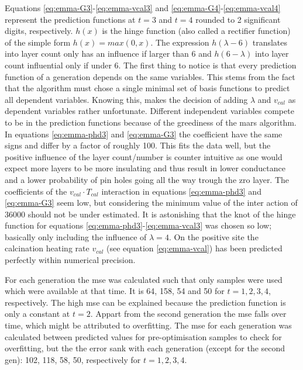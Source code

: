 Equations \ref{eq:emma-G3}-\ref{eq:emma-vcal3} and \ref{eq:emma-G4}-\ref{eq:emma-vcal4} represent the prediction functions at $t=3$ and $t=4$ rounded to 2 significant digits, respectively.
$h(x)$ is the hinge function (also called a rectifier function) of the simple form $h(x) = max(0,x)$. 
The expression $h(\lambda-6)$ translates into layer count only has an influence if larger than 6 
and $h(6-\lambda)$ into layer count influential only if under 6.
%
The first thing to notice is that every prediction function of a generation depends on the same variables. 
This stems from the fact that the algorithm must chose a single minimal set of basis functions to predict all dependent variables. 
%
Knowing this, makes the decision of adding $\lambda$ and $v_{cal}$ as dependent variables rather unfortunate. %
Different independent variables compete to be in the prediction functions because of the greediness of the \gls{mars} algorithm. 
In equations \ref{eq:emma-phd3} and \ref{eq:emma-G3} the coefficient have the same signs and differ by a factor of roughly 100.
This fits the data well, but the positive influence of the layer count/number is counter intuitive 
as one would expect more layers to be more insulating and thus result in lower conductance and a lower probability of pin holes going all the way trough the \gls{zro} layer. %
The coefficients of the $v_{cal} \cdot T_{cal}$ interaction in equations \ref{eq:emma-phd3} and \ref{eq:emma-G3} 
seem low, but considering the minimum value of the inter action of \num{36000} should not be under estimated. 
It is astonishing that the knot of the hinge function for equations \ref{eq:emma-phd3}-\ref{eq:emma-vcal3} was chosen so low; 
basically only including the influence of $\lambda=4$.
On the positive site the calcination heating rate $v_{cal}$ (see equation \ref{eq:emma-vcal}) has been predicted perfectly within numerical precision. 

For each generation the \gls{mse} was calculated such that only samples were used which were available at that time. 
It is 64, 158, 54 and 50 for $t=1,2,3,4$, respectively. 
The high \gls{mse} can be explained because the prediction function is only a constant at $t=2$. 
Appart from the second generation the \gls{mse} falls over time, which might be attributed to overfitting.
The \gls{mse} for each generation was calculated between predicted values for pre-optimisation samples to check for overfitting, 
but the the error sank with each generation (except for the second gen): 102, 118, 58, 50, respectively for $t=1,2,3,4$. 

